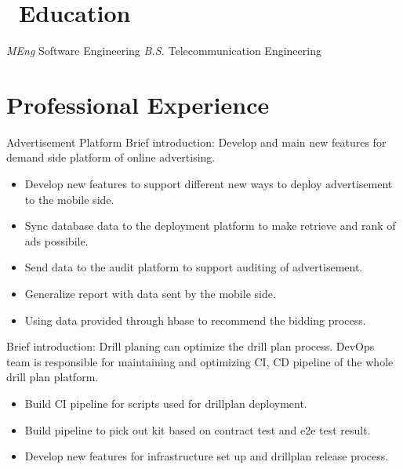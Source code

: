 \documentclass{resume}
\begin{document}



\section{\faGraduationCap\ Education}
\textit{MEng} Software Engineering
\textit{B.S.} Telecommunication Engineering

\section{Professional Experience}

 {Advertisement Platform}
Brief introduction: Develop and main new features for demand side platform of online advertising.
\begin{itemize}
  \item Develop new features to support different new ways to deploy advertisement to the mobile side.
  \item Sync database data to the deployment platform to make retrieve and rank of ads possibile.
  \item Send data to the audit platform to support auditing of advertisement.
  \item Generalize report with data sent by the mobile side.
  \item Using data provided through hbase to recommend the bidding process.
\end{itemize}


Brief introduction: Drill planing can optimize the drill plan process. DevOps team is responsible for maintaining and optimizing CI, CD pipeline of the whole drill plan platform. 
\begin{itemize}
  \item Build CI pipeline for scripts used for drillplan deployment.
  \item Build pipeline to pick out kit based on contract test and e2e test result.
  \item Develop new features for infrastructure set up and drillplan release process.
\end{itemize}
\end{document}
